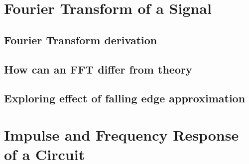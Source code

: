 \documentclass[11pt]{article}
\begin{document}


\pagebreak


\tableofcontents
\pagebreak




\section{Fourier Transform of a Signal}\label{sec:fourier_transform_of_a_signal}

\subsection{Fourier Transform derivation}\label{subsec:fourier_transform_derivation}


\subsection{How can an FFT differ from theory}\label{subsec:fourier_transform_of_a_square_wave}


\subsection{Exploring effect of falling edge approximation}\label{subsec:exploring_effect_of_falling_edge_approximation}



\section{Impulse and Frequency Response of a Circuit}\label{sec:impulse_and_frequency_response_of_a_circuit}
\end{document}
